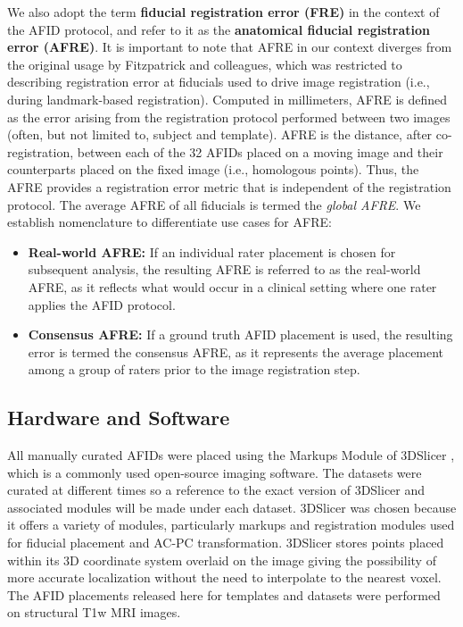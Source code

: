 We also adopt the term \textbf{fiducial registration error (FRE)} in the context of the AFID protocol, and refer to it as the \textbf{anatomical fiducial registration error (AFRE)}. It is important to note that AFRE in our context diverges from the original usage by Fitzpatrick and colleagues\cite{Fitzpatrick1998-hp}, which was restricted to describing registration error at fiducials used to drive image registration (i.e., during landmark-based registration). Computed in millimeters, AFRE is defined as the error arising from the registration protocol performed between two images (often, but not limited to, subject and template). AFRE is the distance, after co-registration, between each of the 32 AFIDs placed on a moving image and their counterparts placed on the fixed image (i.e., homologous points). Thus, the AFRE provides a registration error metric that is independent of the registration protocol. The average AFRE of all fiducials is termed the \emph{global AFRE}. We  establish nomenclature to differentiate use cases for AFRE:
\begin{itemize}
    \item \textbf{Real-world AFRE:} If an individual rater placement is chosen for subsequent analysis, the resulting AFRE is referred to as the real-world AFRE, as it reflects what would occur in a clinical setting where one rater applies the AFID protocol.
    \item \textbf{Consensus AFRE:} If a ground truth AFID placement is used, the resulting error is termed the consensus AFRE, as it represents the average placement among a group of raters prior to the image registration step.
\end{itemize}

\subsection{Hardware and Software}
All manually curated AFIDs were placed using the Markups Module of 3DSlicer \cite{Fedorov2012-rk}, which is a commonly used open-source imaging software. The datasets were curated at different times so a reference to the exact version of 3DSlicer and associated modules will be made under each dataset. 3DSlicer was chosen because it offers a variety of modules, particularly markups and registration modules used for fiducial placement and AC-PC transformation. 3DSlicer stores points placed within its 3D coordinate system overlaid on the image giving the possibility of more accurate localization without the need to interpolate to the nearest voxel. The AFID placements released here for templates and datasets were performed on structural T1w MRI images.

